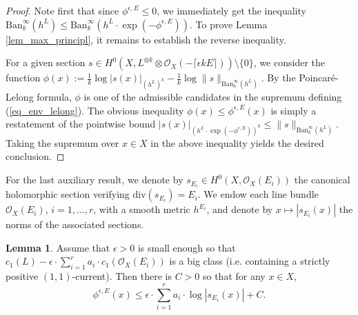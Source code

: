 \documentclass[12pt]{article}
\numberwithin{equation}{section}
\theoremstyle{theorem}
\theoremstyle{definition}
\newtheorem{lem}[thm]{Lemma}
\theoremstyle{remark}
\begin{document}
	\begin{proof}
		Note first that since $\phi^{\epsilon, E} \leq 0$, we immediately get the inequality ${\textrm{Ban}}_k^{\infty}(h^L) \leq {\textrm{Ban}}_k^{\infty}(h^L \cdot \exp(-\phi^{\epsilon, E}))$.
		To prove Lemma \ref{lem_max_principl}, it remains to establish the reverse inequality.
		\par 
		For a given section $s \in H^0(X, L^{\otimes k} \otimes \mathscr{O}_X(- \lceil \epsilon k E \rceil)) \setminus \{ 0 \}$, we consider the function $\phi(x) := \frac{1}{k} \log |s(x)|_{(h^L)^k} -  \frac{1}{k} \log \| s \|_{{\textrm{Ban}}_k^{\infty}(h^L)}$.
		By the Poincaré-Lelong formula, $\phi$ is one of the admissible candidates in the supremum defining (\ref{eq_env_lelong}).
		The obvious inequality $\phi(x) \leq \phi^{\epsilon, E}(x)$ is simply a restatement of the pointwise bound $|s(x)|_{(h^L \cdot \exp(- \phi^{\epsilon, E}))^k} \leq \| s \|_{{\textrm{Ban}}_k^{\infty}(h^L)}$.
		Taking the supremum over $x \in X$ in the above inequality yields the desired conclusion.
	\end{proof}
	\par 
	For the last auxiliary result, we denote by $s_{E_i} \in H^0(X, \mathscr{O}_X(E_i))$ the canonical holomorphic section verifying ${\textrm{div}}(s_{E_i}) = E_i$.
	We endow each line bundle $\mathscr{O}_X(E_i)$, $i = 1, \ldots, r$, with a smooth metric $h^{E_i}$, and denote by $x \mapsto |s_{E_i}(x)|$ the norms of the associated sections.
	\begin{lem}\label{lem_sing_env}
		Assume that $\epsilon > 0$ is small enough so that $c_1(L) - \epsilon \cdot \sum_{i = 1}^{r} a_i \cdot c_1(\mathscr{O}_X(E_i))$ is a big class (i.e. containing a strictly positive $(1, 1)$-current).
		Then there is $C > 0$ so that for any $x \in X$,
		\begin{equation}
			\phi^{\epsilon, E}(x) \leq \epsilon \cdot \sum_{i = 1}^{r} a_i \cdot \log |s_{E_i}(x)| + C.
		\end{equation}
	\end{lem}
\end{document}
